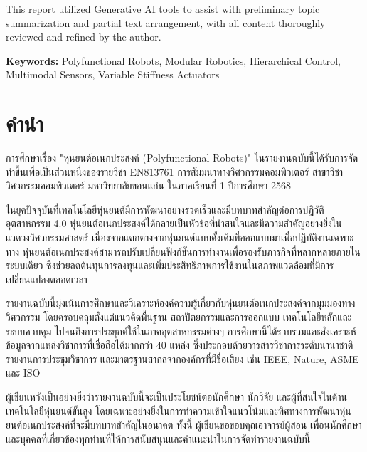 \documentclass[a4paper]{article}
\begin{document}
This report utilized Generative AI tools to assist with preliminary topic summarization and partial text arrangement, with all content thoroughly reviewed and refined by the author.

\vspace{1em}

\noindent
\textbf{Keywords:} Polyfunctional Robots, Modular Robotics, Hierarchical Control, Multimodal Sensors, Variable Stiffness Actuators

\newpage

\tableofcontents
\newpage

\setcounter{page}{1}

\section*{คำนำ}
การศึกษาเรื่อง "หุ่นยนต์อเนกประสงค์ (Polyfunctional Robots)" ในรายงานฉบับนี้ได้รับการจัดทำขึ้นเพื่อเป็นส่วนหนึ่งของรายวิชา EN813761 การสัมมนาทางวิศวกรรมคอมพิวเตอร์ สาขาวิชาวิศวกรรมคอมพิวเตอร์ มหาวิทยาลัยขอนแก่น ในภาคเรียนที่ 1 ปีการศึกษา 2568

ในยุคปัจจุบันที่เทคโนโลยีหุ่นยนต์มีการพัฒนาอย่างรวดเร็วและมีบทบาทสำคัญต่อการปฏิวัติอุตสาหกรรม 4.0 หุ่นยนต์อเนกประสงค์ได้กลายเป็นหัวข้อที่น่าสนใจและมีความสำคัญอย่างยิ่งในแวดวงวิศวกรรมศาสตร์ เนื่องจากแตกต่างจากหุ่นยนต์แบบดั้งเดิมที่ออกแบบมาเพื่อปฏิบัติงานเฉพาะทาง หุ่นยนต์อเนกประสงค์สามารถปรับเปลี่ยนฟังก์ชันการทำงานเพื่อรองรับภารกิจที่หลากหลายภายในระบบเดียว ซึ่งช่วยลดต้นทุนการลงทุนและเพิ่มประสิทธิภาพการใช้งานในสภาพแวดล้อมที่มีการเปลี่ยนแปลงตลอดเวลา

รายงานฉบับนี้มุ่งเน้นการศึกษาและวิเคราะห์องค์ความรู้เกี่ยวกับหุ่นยนต์อเนกประสงค์จากมุมมองทางวิศวกรรม โดยครอบคลุมตั้งแต่แนวคิดพื้นฐาน สถาปัตยกรรมและการออกแบบ เทคโนโลยีหลักและระบบควบคุม ไปจนถึงการประยุกต์ใช้ในภาคอุตสาหกรรมต่างๆ การศึกษานี้ได้รวบรวมและสังเคราะห์ข้อมูลจากแหล่งวิชาการที่เชื่อถือได้มากกว่า 40 แหล่ง ซึ่งประกอบด้วยวารสารวิชาการระดับนานาชาติ รายงานการประชุมวิชาการ และมาตรฐานสากลจากองค์กรที่มีชื่อเสียง เช่น IEEE, Nature, ASME และ ISO

ผู้เขียนหวังเป็นอย่างยิ่งว่ารายงานฉบับนี้จะเป็นประโยชน์ต่อนักศึกษา นักวิจัย และผู้ที่สนใจในด้านเทคโนโลยีหุ่นยนต์ขั้นสูง โดยเฉพาะอย่างยิ่งในการทำความเข้าใจแนวโน้มและทิศทางการพัฒนาหุ่นยนต์อเนกประสงค์ที่จะมีบทบาทสำคัญในอนาคต ทั้งนี้ ผู้เขียนขอขอบคุณอาจารย์ผู้สอน เพื่อนนักศึกษา และบุคคลที่เกี่ยวข้องทุกท่านที่ให้การสนับสนุนและคำแนะนำในการจัดทำรายงานฉบับนี้
\end{document}
